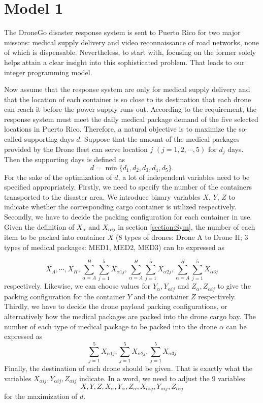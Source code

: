\documentclass{mcmthesis}
\begin{document}
\section{Model 1}
The DroneGo disaster response system is sent to Puerto Rico for two major missons: medical supply delivery and video reconnaissance of road networks, none of which is dispensable. Nevertheless, to start with, focusing on the former solely helps attain a clear insight into this sophisticated problem. That leads to our integer programming model.

\noindent Now assume that the response system are only for medical supply delivery and that the location of each container is so close to its destination that each drone can reach it before the power supply runs out. According to the requirement, the response system must meet the daily medical package demand of the five selected locations in Puerto Rico. Therefore, a natural objective is to maximize the so-called supporting days $d$. Suppose that the amount of the medical packages provided by the Drone fleet can serve location $j$ $(j=1,2,\cdots,5)$ for $d_j$ days. Then the supporting days is defined as
\begin{equation}
	d=\min\{d_1,d_2,d_3,d_4,d_5\}.
\end{equation}
For the sake of the optimization of $d$, a lot of independent variables need to be specified appropriately. Firstly, we need to specify the number of the containers transported to the disaster area. We introduce binary variables $X$, $Y$, $Z$ to indicate whether the corresponding cargo container is utilized respectively. Secondly, we have to decide the packing configuration for each container in use. Given the definition of $X_\alpha$ and $X_{\alpha ij}$ in section \ref{section:Sym}, the number of each item to be packed into container $X$ (8 types of drones: Drone A to Drone H; 3 types of medical packages: MED1, MED2, MED3) can be expressed as
 
\begin{equation*}
	X_A,\cdots,X_H,\sum_{\alpha=A}^H\sum_{j=1}^{5}X_{\alpha 1j},\sum_{\alpha=A}^H\sum_{j=1}^{5}X_{\alpha 2j},\sum_{\alpha=A}^H\sum_{j=1}^{5}X_{\alpha 3j}
\end{equation*} 
respectively. Likewise, we can choose values for $Y_\alpha,Y_{\alpha ij}$ and $Z_{\alpha},Z_{\alpha ij}$ to give the packing configuration for the container $Y$ and the container $Z$ respectively. Thirdly, we have to decide the drone payload packing configurations, or alternatively how the medical packages are packed into the drone cargo bay. The number of each type of medical package to be packed into the drone $\alpha$ can be expressed as
\begin{equation*}
\sum_{j=1}^{5}X_{\alpha 1j},\sum_{j=1}^{5}X_{\alpha 2j},\sum_{j=1}^{5}X_{\alpha 3j}
\end{equation*} Finally, the destination of each drone should be given. That is exactly what the variables $X_{\alpha ij},Y_{\alpha ij},Z_{\alpha ij}$ indicate. In a word, we need to adjust the 9 variables
\[
X,Y,Z,X_{\alpha},Y_{\alpha},Z_{\alpha},X_{\alpha ij},Y_{\alpha ij},Z_{\alpha ij}
\]
for the maximization of $d$.
\end{document}
